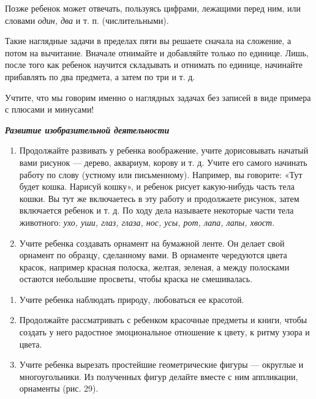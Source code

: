 \documentclass[a5paper]{book}
\renewcommand{\emph}[1]{\textit{#1}}
\begin{document}
Позже ребенок может отвечать, пользуясь цифрами, лежащими перед ним, или
словами \emph{один, два} и т. п. (числительными).

Такие наглядные задачи в пределах пяти вы решаете сначала на сложение, а
потом на вычитание. Вначале отнимайте и добавляйте только по единице.
Лишь, после того как ребенок научится складывать и отнимать по единице,
начинайте прибавлять по два предмета, а затем по три и т. д.

Учтите, что мы говорим именно о наглядных задачах без записей в виде
примера с плюсами и минусами!

\emph{\textbf{Развитие изобразительной деятельности}}


\begin{enumerate}
\def\labelenumi{\arabic{enumi}.}
\item
  
  Продолжайте развивать у ребенка воображение, учите дорисовывать
  начатый вами рисунок --- дерево, аквариум, корову и т. д. Учите его
  самого начинать работу по слову (устному или письменному). Например,
  вы говорите: «Тут будет кошка. Нарисуй кошку», и ребенок рисует
  какую-нибудь часть тела кошки. Вы тут же включаетесь в эту работу и
  продолжаете рисунок, затем включается ребенок и т. д. По ходу дела
  называете некоторые части тела животного: \emph{ухо, уши, глаз, глаза,
  нос, усы, рот, лапа, лапы, хвост.}
  
\item
  
  Учите ребенка создавать орнамент на бумажной ленте. Он делает свой
  орнамент по образцу, сделанному вами. В орнаменте чередуются цвета
  красок, например красная полоска, желтая, зеленая, а между полосками
  остаются небольшие просветы, чтобы краска не смешивалась.
  
\end{enumerate}

\begin{enumerate}
\def\labelenumi{\arabic{enumi}.}
\setcounter{enumi}{2}
\item
  
  Учите ребенка наблюдать природу, любоваться ее красотой.
  
\item
  
  Продолжайте рассматривать с ребенком красочные предметы и книги, чтобы
  создать у него радостное эмоциональное отношение к цвету, к ритму
  узора и цвета.
  
\item
  
  Учите ребенка вырезать простейшие геометрические фигуры --- округлые и
  многоугольники. Из полученных фигур делайте вместе с ним аппликации,
  орнаменты (рис. 29).
  
\end{enumerate}
\end{document}
